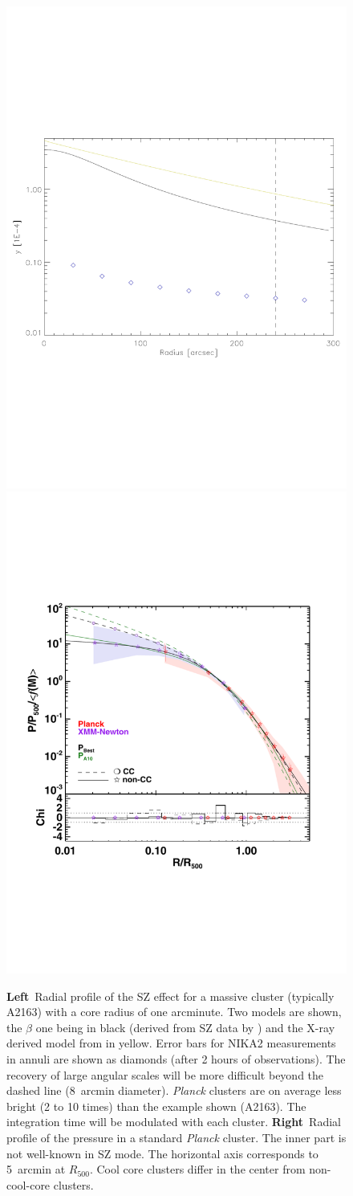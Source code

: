 \documentclass[10pt,a4paper,twoside,graphicx,color]{article}
\begin{document}
\begin{figure}
  \begin{center}
   \includegraphics[width=0.45\columnwidth]{./Figures/Arsenal_SZprofile.pdf}
   \includegraphics[width=0.45\columnwidth]{./Figures/PressureProfilePlanckXMM.pdf}
  \end{center}
  \caption{{\bf Left}~Radial profile of the SZ effect for a massive
    cluster (typically A2163) with a core radius of one arcminute. Two
    models are shown, the $\beta$ one being in black (derived from SZ
    data by \cite{Reese2002}) and the X-ray derived model from
    \cite{Arnaud2010} in yellow. Error bars for NIKA2 measurements in
    annuli are shown as diamonds (after 2 hours of observations). The
    recovery of large angular scales will be more difficult beyond the
    dashed line (8~arcmin diameter). {\sl Planck} clusters are on
    average less bright (2 to 10 times) than the example shown
    (A2163). The integration time will be modulated with each
    cluster. {\bf Right}~Radial profile of the pressure in a standard
    {\sl Planck} cluster. The inner part is not well-known in SZ
    mode. The horizontal axis corresponds to 5~arcmin at
    $R_{500}$. Cool core clusters differ in the center from
    non-cool-core clusters.}
  
\label{Fig:SZprofile}
\end{figure}
   
\end{document}
